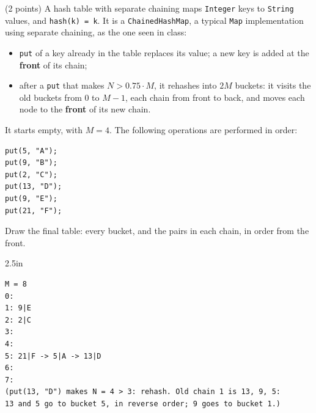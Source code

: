 \begin{question}
(2 points) A hash table with separate chaining maps \lstinline|Integer| keys to \lstinline|String| values, and \lstinline|hash(k) = k|. It is a \lstinline|ChainedHashMap|, a typical \lstinline|Map| implementation using separate chaining, as the one seen in class:
\begin{itemize}[leftmargin=2em,itemsep=1pt,topsep=2pt]
\item \lstinline|put| of a key already in the table replaces its value; a new key is added at the \textbf{front} of its chain;
\item after a \lstinline|put| that makes $N > 0.75 \cdot M$, it rehashes into $2M$ buckets: it visits the old buckets from 0 to $M-1$, each chain from front to back, and moves each node to the \textbf{front} of its new chain.
\end{itemize}

It starts empty, with $M = 4$. The following operations are performed in order:

\begin{minipage}[t]{0.3\linewidth}
\vspace{-\baselineskip}
\begin{lstlisting}
put(5, "A");
put(9, "B");
put(2, "C");
put(13, "D");
put(9, "E");
put(21, "F");
\end{lstlisting}
\end{minipage}\hfill
\begin{minipage}[t]{0.66\linewidth}
Draw the final table: every bucket, and the pairs in each chain, in order from the front.
\end{minipage}

\begin{answerspace}{2.5in}
\ifanswers
\begin{verbatim}
M = 8
0:
1: 9|E
2: 2|C
3:
4:
5: 21|F -> 5|A -> 13|D
6:
7:
(put(13, "D") makes N = 4 > 3: rehash. Old chain 1 is 13, 9, 5:
13 and 5 go to bucket 5, in reverse order; 9 goes to bucket 1.)
\end{verbatim}
\fi
\end{answerspace}
\end{question}

